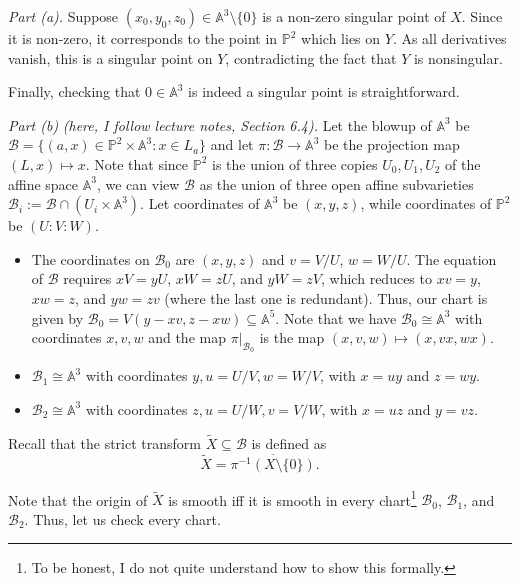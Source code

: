 \documentclass{template}
\begin{document}
\textcolor{blue!70!black}{\textit{Part (a).}} Suppose $(x_0,y_0,z_0) \in \mathbb{A}^3 \setminus \{0\}$ is a
non-zero singular point of $X$. Since it is non-zero, it corresponds to the
point in $\mathbb{P}^2$ which lies on $Y$. As all derivatives vanish, this is a
singular point on $Y$, contradicting the fact that $Y$ is nonsingular.

Finally, checking that $0 \in \mathbb{A}^3$ is indeed a singular point is
straightforward.

\textcolor{blue!70!black}{\textit{Part (b)}} \textit{(here, I follow lecture
notes, Section 6.4).} Let the blowup of $\mathbb{A}^3$ be $\mathcal{B} = \{(a,x)
\in \mathbb{P}^2 \times \mathbb{A}^3: x \in L_a\}$ and let $\pi: \mathcal{B} \to
\mathbb{A}^{3}$ be the projection map $(L,x) \mapsto x$. Note that since
$\mathbb{P}^2$ is the union of three copies $U_0,U_1,U_2$ of the affine space
$\mathbb{A}^3$, we can view $\mathcal{B}$ as the union of three open affine
subvarieties $\mathcal{B}_i := \mathcal{B} \cap (U_i \times \mathbb{A}^3)$. Let
coordinates of $\mathbb{A}^3$ be $(x,y,z)$, while coordinates of $\mathbb{P}^2$
be $(U:V:W)$.
\begin{itemize}
    \item The coordinates on $\mathcal{B}_0$ are $(x,y,z)$ and $v=V/U$, $w=W/U$.
    The equation of $\mathcal{B}$ requires $xV=yU$, $xW=zU$, and $yW=zV$, which
    reduces to $xv=y$, $xw=z$, and $yw=zv$ (where the last one is redundant).
    Thus, our chart is given by $\mathcal{B}_0=V(y-xv,z-xw) \subseteq
    \mathbb{A}^5$. Note that we have $\mathcal{B}_0 \cong \mathbb{A}^3$
    with coordinates $x,v,w$ and the map $\pi|_{\mathcal{B}_0}$ is the map 
    $(x,v,w) \mapsto (x,vx,wx)$.
    \item $\mathcal{B}_1 \cong \mathbb{A}^3$ with coordinates $y,u=U/V,w=W/V$,
    with $x=uy$ and $z=wy$.
    \item $\mathcal{B}_2 \cong \mathbb{A}^3$ with coordinates $z,u=U/W,v=V/W$,
    with $x=uz$ and $y=vz$.
\end{itemize}

Recall that the strict transform $\widetilde{X} \subseteq
\mathcal{B}$ is defined as
\begin{equation*}
    \widetilde{X} = \overline{\pi^{-1}(X \setminus \{0\})}.
\end{equation*}

Note that the origin of $\widetilde{X}$ is smooth iff it is smooth in every
chart\footnote{To be honest, I do not quite understand how to show this
formally.} $\mathcal{B}_0$, $\mathcal{B}_1$, and $\mathcal{B}_2$. Thus, let us
check every chart.
\end{document}
